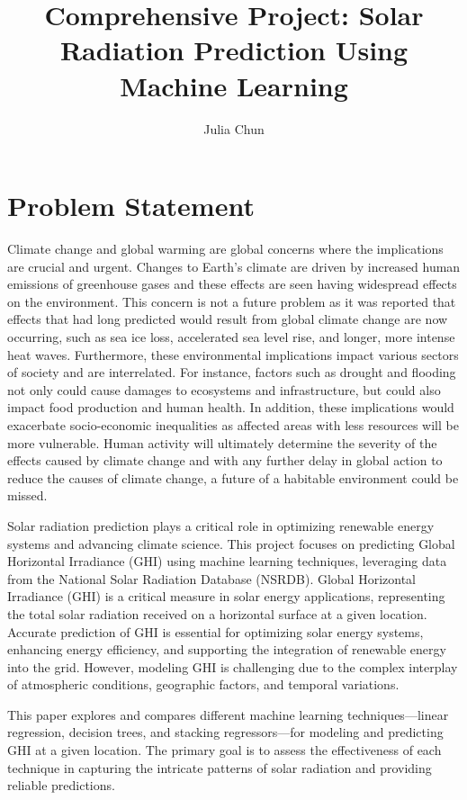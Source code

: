 \documentclass[10pt,twocolumn]{article}
\title{Comprehensive Project: {Solar Radiation Prediction Using Machine Learning}}
\author{Julia Chun}
\affiliation{Occidental College}
\begin{document}
\maketitle

\section{Problem Statement }
Climate change and global warming are global concerns where the implications are crucial and urgent. Changes to Earth's climate are driven by increased human emissions of greenhouse gases and these effects are seen having widespread effects on the environment. This concern is not a future problem as it was reported that effects that had long predicted would result from global climate change are now occurring, such as sea ice loss, accelerated sea level rise, and longer, more intense heat waves. Furthermore, these environmental implications impact various sectors of society and are interrelated. For instance, factors such as drought and flooding not only could cause damages to ecosystems and infrastructure, but could also impact food production and human health. In addition, these implications would exacerbate socio-economic inequalities as affected areas with less resources will be more vulnerable. Human activity will ultimately determine the severity of the effects caused by climate change and with any further delay in global action to reduce the causes of climate change, a future of a habitable environment could be missed.

Solar radiation prediction plays a critical role in optimizing renewable energy systems and advancing climate science. This project focuses on predicting Global Horizontal Irradiance (GHI) using machine learning techniques, leveraging data from the National Solar Radiation Database (NSRDB).  Global Horizontal Irradiance (GHI) is a critical measure in solar energy applications, representing the total solar radiation received on a horizontal surface at a given location. Accurate prediction of GHI is essential for optimizing solar energy systems, enhancing energy efficiency, and supporting the integration of renewable energy into the grid. However, modeling GHI is challenging due to the complex interplay of atmospheric conditions, geographic factors, and temporal variations.

This paper explores and compares different machine learning techniques—linear regression, decision trees, and stacking regressors—for modeling and predicting GHI at a given location. The primary goal is to assess the effectiveness of each technique in capturing the intricate patterns of solar radiation and providing reliable predictions.
\end{document}
